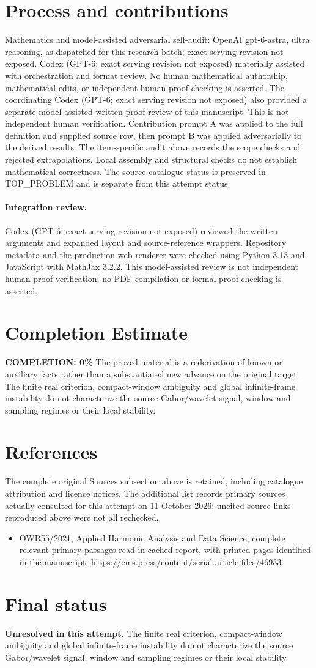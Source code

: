 \documentclass[11pt]{article}
\begin{document}
\section{Process and contributions}
Mathematics and model-assisted adversarial self-audit: OpenAI gpt-6-astra, ultra reasoning, as dispatched for this research batch; exact serving revision not exposed. Codex (GPT-6; exact serving revision not exposed) materially assisted with orchestration and format review. No human mathematical authorship, mathematical edits, or independent human proof checking is asserted.
The coordinating Codex (GPT-6; exact serving revision not exposed) also provided a separate model-assisted written-proof review of this manuscript. This is not independent human verification.
Contribution prompt A was applied to the full definition and supplied source row, then prompt B was applied adversarially to the derived results. The item-specific audit above records the scope checks and rejected extrapolations. Local assembly and structural checks do not establish mathematical correctness. The source catalogue status is preserved in TOP\_PROBLEM and is separate from this attempt status.
\paragraph{Integration review.} Codex (GPT-6; exact serving revision not exposed) reviewed the written arguments and expanded layout and source-reference wrappers. Repository metadata and the production web renderer were checked using Python 3.13 and JavaScript with MathJax 3.2.2. This model-assisted review is not independent human proof verification; no PDF compilation or formal proof checking is asserted.

\section{Completion Estimate}
\noindent\textbf{COMPLETION: 0\%}
The proved material is a rederivation of known or auxiliary facts rather than a substantiated new advance on the original target. The finite real criterion, compact-window ambiguity and global infinite-frame instability do not characterize the source Gabor/wavelet signal, window and sampling regimes or their local stability.
\section{References}
The complete original Sources subsection above is retained, including catalogue attribution and licence notices. The additional list records primary sources actually consulted for this attempt on 11 October 2026; uncited source links reproduced above were not all rechecked.
\begin{itemize}
\item OWR55/2021, Applied Harmonic Analysis and Data Science; complete relevant primary passages read in cached report, with printed pages identified in the manuscript. \url{https://ems.press/content/serial-article-files/46933}.
\end{itemize}
\section{Final status}
\textbf{Unresolved in this attempt.} The finite real criterion, compact-window ambiguity and global infinite-frame instability do not characterize the source Gabor/wavelet signal, window and sampling regimes or their local stability.
\end{document}
